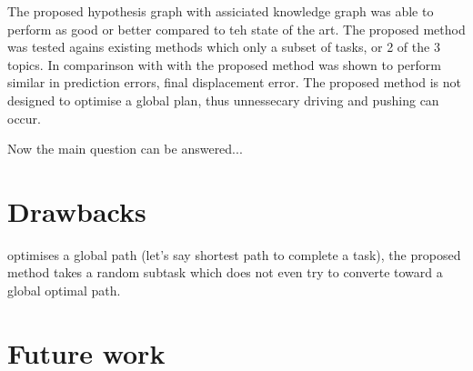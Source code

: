 The proposed hypothesis graph with assiciated knowledge graph was able to perform as good or better compared to teh state of the art. The proposed method was tested agains existing methods which only a subset of tasks, or 2 of the 3 topics. In comparinson with with\cite{sabbaghnovin_model_2021} the proposed method was shown to perform similar in prediction errors, final displacement error. The proposed method is not designed to optimise a global plan, thus unnessecary driving and pushing can occur. 
\vspace{\baselineskip}

Now the main question can be answered...


\section{Drawbacks}
\cite{vega-brown_asymptotically_2020} optimises a global path (let's say shortest path to complete a task), the proposed method takes a random subtask which does not even try to converte toward a global optimal path. 

\section{Future work}%
\label{sec:future_work}

